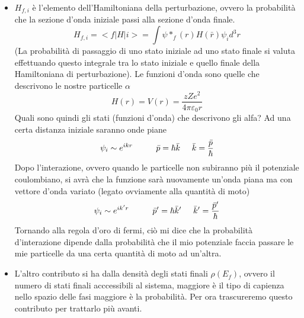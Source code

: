 \begin{itemize}
\item $H_{f,i}$ è l'elemento dell'Hamiltoniana della perturbazione, ovvero la probabilità che la sezione d'onda iniziale passi alla sezione d'onda finale.
\begin{equation}
H_{f,i}=<f|H|i>=\int \psi*_f(r)H(\bar r)\psi_i d^3r
\end{equation}
(La probabilità di passaggio di uno stato iniziale ad uno stato finale si valuta effettuando questo integrale tra lo stato iniziale e quello finale della Hamiltoniana di perturbazione).
Le funzioni d'onda sono quelle che descrivono le nostre particelle $\alpha$
\begin{equation}
H(r)=V(r)=\frac{zZe^2}{4\pi \varepsilon_0r}
\end{equation}
Quali sono quindi gli stati (funzioni d'onda) che descrivono gli alfa?
Ad una certa distanza iniziale saranno onde piane
\begin{equation}
\psi_i \sim e^{ikr} \hspace{1cm}\bar p=\hbar\bar k\hspace{0.5cm}\bar k=\frac{\bar p}{\hbar}
\end{equation}
Dopo l'interazione, ovvero quando le particelle non subiranno più il potenziale coulombiano, si avrà che la funzione sarà nuovamente un'onda piana ma con vettore d'onda variato (legato ovviamente alla quantità di moto)
\begin{equation}
\psi_i \sim e^{ik'r}\hspace{1cm} \bar p'=\hbar\bar k'\hspace{0.5cm}\bar k'=\frac{\bar p'}{\hbar}
\end{equation}
Tornando alla regola d'oro di fermi, ciò mi dice che la probabilità d'interazione dipende dalla probabilità che il mio potenziale faccia passare le mie particelle da una certa quantità di moto ad un'altra.

\item L'altro contributo si ha dalla densità degli stati finali $\rho(E_f)$, ovvero il numero di stati finali acccessibili al sistema, maggiore è il tipo di capienza nello spazio delle fasi maggiore è la probabilità. Per ora trascureremo questo contributo per trattarlo più avanti.
\end{itemize}

